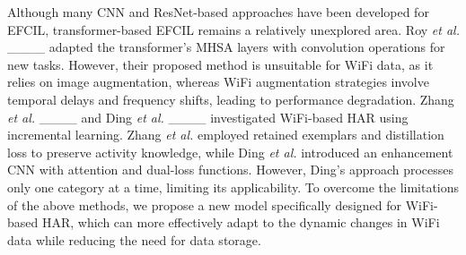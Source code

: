 Although many CNN and ResNet-based approaches have been developed for EFCIL, transformer-based EFCIL remains a relatively unexplored area.
Roy \textit{et al.} ____ adapted the transformer's MHSA layers with convolution operations for new tasks. However, their proposed method is unsuitable for WiFi data, as it relies on image augmentation, whereas WiFi augmentation strategies involve temporal delays and frequency shifts, leading to performance degradation.
Zhang \textit{et al.} ____ and Ding \textit{et al.} ____ investigated WiFi-based HAR using incremental learning. Zhang \textit{et al.} employed retained exemplars and distillation loss to preserve activity knowledge, while Ding \textit{et al.} introduced an enhancement CNN with attention and dual-loss functions. However, Ding's approach processes only one category at a time, limiting its applicability.
To overcome the limitations of the above methods, we propose a new model specifically designed for WiFi-based HAR, which can more effectively adapt to the dynamic changes in WiFi data while reducing the need for data storage.

